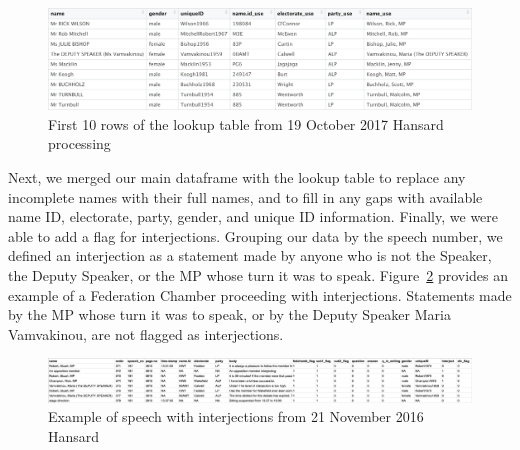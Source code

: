 \documentclass[
  letterpaper,
  DIV=11,
  numbers=noendperiod]{scrartcl}
\begin{document}
\begin{figure}

{\centering \includegraphics[width=4.66667in,height=\textheight]{images/lookup_ex.png}

}

\caption{\label{fig-lookup}First 10 rows of the lookup table from 19
October 2017 Hansard processing}

\end{figure}

Next, we merged our main dataframe with the lookup table to replace any
incomplete names with their full names, and to fill in any gaps with
available name ID, electorate, party, gender, and unique ID information.
Finally, we were able to add a flag for interjections. Grouping our data
by the speech number, we defined an interjection as a statement made by
anyone who is not the Speaker, the Deputy Speaker, or the MP whose turn
it was to speak. Figure~\ref{fig-interject} provides an example of a
Federation Chamber proceeding with interjections. Statements made by the
MP whose turn it was to speak, or by the Deputy Speaker Maria
Vamvakinou, are not flagged as interjections.

\begin{figure}

{\centering \includegraphics{images/interject_ex.png}

}

\caption{\label{fig-interject}Example of speech with interjections from
21 November 2016 Hansard}

\end{figure}
\end{document}
